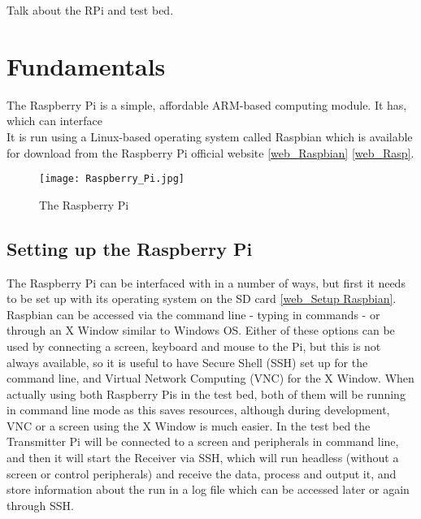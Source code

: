 \documentclass[../main.tex]{subfiles}
\begin{document}
Talk about the RPi and test bed.


\section{Fundamentals}

The Raspberry Pi is a simple, affordable ARM-based computing module. It has, which can interface\\

It is run using a Linux-based operating system called Raspbian which is available for download from the Raspberry Pi official website \ref{web_Raspbian} \ref{web_Rasp}.\\


\begin{figure}[ht]
	\centering
	\texttt{[image: Raspberry\_Pi.jpg]}
	\caption{The Raspberry Pi}
\end{figure}

\subsection{Setting up the Raspberry Pi}

The Raspberry Pi can be interfaced with in a number of ways, but first it needs to be set up with its operating system on the SD card \ref{web_Setup Raspbian}.
Raspbian can be accessed via the command line - typing in commands - or through an X Window similar to Windows OS.
Either of these options can be used by connecting a screen, keyboard and mouse to the Pi, but this is not always available, so it is useful to have Secure Shell (SSH) set up for the command line, and Virtual Network Computing (VNC) for the X Window.
When actually using both Raspberry Pis in the test bed, both of them will be running in command line mode as this saves resources, although during development, VNC or a screen using the X Window is much easier.
In the test bed the Transmitter Pi will be connected to a screen and peripherals in command line, and then it will start the Receiver via SSH, which will run headless (without a screen or control peripherals) and receive the data, process and output it, and store information about the run in a log file which can be accessed later or again through SSH.\\
\end{document}
